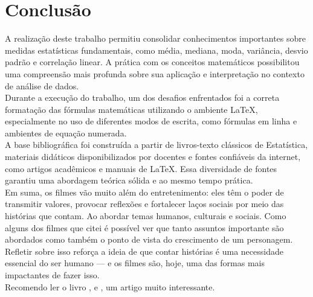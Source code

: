 \documentclass[
    12pt,                  %
    openright,             %
    oneside,               %
    a4paper,               %
    chapter=TITLE,         %
    section=TITLE,         %
    brazil                 %
]{abntex2}                 %
\begin{document}
\chapter*{Conclusão}
A realização deste trabalho permitiu consolidar conhecimentos importantes sobre medidas estatísticas fundamentais, como média, mediana, moda, variância, desvio padrão e correlação linear. A prática com os conceitos matemáticos possibilitou uma compreensão mais profunda sobre sua aplicação e interpretação no contexto de análise de dados.\\
\vspace{13px}
\noindent Durante a execução do trabalho, um dos desafios enfrentados foi a correta formatação das fórmulas matemáticas utilizando o ambiente LaTeX, especialmente no uso de diferentes modos de escrita, como fórmulas em linha e ambientes de equação numerada.\\
\vspace{13px}
\noindent A base bibliográfica foi construída a partir de livros-texto clássicos de Estatística, materiais didáticos disponibilizados por docentes e fontes confiáveis da internet, como artigos acadêmicos e manuais de LaTeX. Essa diversidade de fontes garantiu uma abordagem teórica sólida e ao mesmo tempo prática.\\
\vspace{13px}
\noindent Em suma, os filmes vão muito além do entretenimento: eles têm o poder de transmitir valores, provocar reflexões e fortalecer laços sociais por meio das histórias que contam. Ao abordar temas humanos, culturais e sociais. Como alguns dos filmes que citei é possível ver que tanto assuntos importante são abordados como também o ponto de vista do crescimento de um personagem. Refletir sobre isso reforça a ideia de que contar histórias é uma necessidade essencial do ser humano — e os filmes são, hoje, uma das formas mais impactantes de fazer isso. \\
\vspace{13px}
Recomendo ler o livro \cite{Eisenstein2002}, e \cite{Cinema}, um artigo muito interessante.




\end{document}
